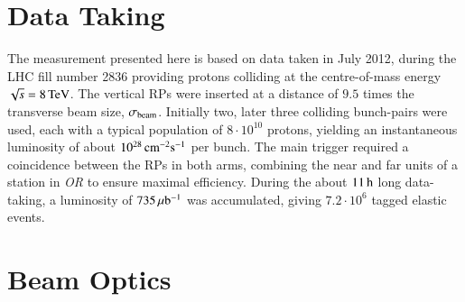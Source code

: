 \section{Data Taking}
\label{sec:data taking}

The measurement presented here is based on data taken in July 2012, during the LHC fill number 2836 providing protons colliding at the centre-of-mass energy $\sqrt s = 8\,{\rm TeV}$. The vertical RPs were inserted at a distance of $9.5$ times the transverse beam size, $\sigma_{\rm beam}$. Initially two, later three colliding bunch-pairs were used, each with a typical population of $8\cdot10^{10}$ protons, yielding an instantaneous luminosity of about $10^{28}\,{\rm cm^{-2}s^{-1}}$ per bunch. The main trigger required a coincidence between the RPs in both arms, combining the near and far units of a station in \textit{OR} to ensure maximal efficiency. During the about $11\,{\rm h}$ long data-taking, a luminosity of $735\,{\rm \mu b^{-1}}$ was accumulated, giving $7.2\cdot 10^6$ tagged elastic events.



\section{Beam Optics}
\label{sec:beam optics}

